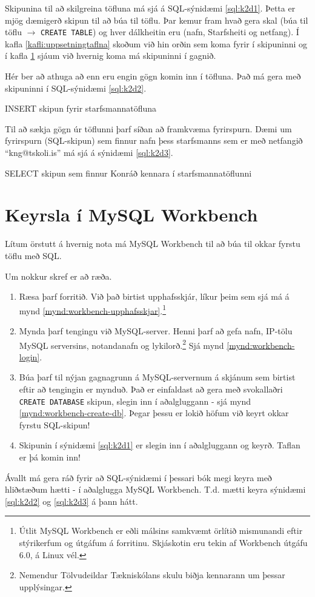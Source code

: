 Skipunina til að skilgreina töfluna má sjá á SQL-sýnidæmi \ref{sql:k2d1}. Þetta er mjög dæmigerð skipun til að búa til töflu. Þar kemur fram hvað gera skal (búa til töflu $\rightarrow$ \verb|CREATE TABLE|) og hver dálkheitin eru (nafn, Starfsheiti og netfang). Í kafla \ref{kafli:uppsetningtaflna} skoðum við hin orðin sem koma fyrir í skipuninni og í kafla \ref{undirkafli:keyrslaiworkbench} sjáum við hvernig koma má skipuninni í gagnið.

Hér ber að athuga að enn eru engin gögn komin inn í töfluna. Það má gera með skipuninni í SQL-sýnidæmi \ref{sql:k2d2}.

\begin{example}[h]
\caption{INSERT skipun fyrir starfsmannatöfluna}
\label{sql:k2d2}
\centering
{\small
{}
}
\end{example}

Til að sækja gögn úr töflunni þarf síðan að framkvæma fyrirspurn. Dæmi um fyrirspurn (SQL-skipun) sem finnur nafn þess starfsmanns sem er með netfangið ``kng@tskoli.is'' má sjá á sýnidæmi \ref{sql:k2d3}.

\begin{example}[h]
\caption{SELECT skipun sem finnur Konráð kennara í starfsmannatöflunni}
\label{sql:k2d3}
\centering
{}
\end{example}

\section{Keyrsla í MySQL Workbench}
\label{undirkafli:keyrslaiworkbench}
Lítum örstutt á hvernig nota má MySQL Workbench til að búa til okkar fyrstu töflu með SQL.

Um nokkur skref er að ræða.
\begin{enumerate}
 \item Ræsa þarf forritið. Við það birtist upphafsskjár, líkur þeim sem sjá má á mynd \ref{mynd:workbench-upphafsskjar}.\footnote{Útlit MySQL Workbench er eðli málsins samkvæmt örlítið mismunandi eftir stýrikerfum og útgáfum á forritinu. Skjáskotin eru tekin af Workbench útgáfu 6.0, á Linux vél.}
 \item Mynda þarf tengingu við MySQL-server. Henni þarf að gefa nafn, IP-tölu MySQL serversins, notandanafn og lykilorð.\footnote{Nemendur Tölvudeildar Tækniskólans skulu biðja kennarann um þessar upplýsingar.} Sjá mynd \ref{mynd:workbench-login}.
 \item Búa þarf til nýjan gagnagrunn á MySQL-servernum á skjánum sem birtist eftir að tengingin er mynduð. Það er einfaldast að gera með svokallaðri \verb|CREATE DATABASE| skipun, slegin inn í aðalgluggann - sjá mynd \ref{mynd:workbench-create-db}. Þegar þessu er lokið höfum við keyrt okkar fyrstu SQL-skipun!
 \item Skipunin í sýnidæmi \ref{sql:k2d1} er slegin inn í aðalgluggann og keyrð. Taflan er þá komin inn!
\end{enumerate}
Ávallt má gera ráð fyrir að SQL-sýnidæmi í þessari bók megi keyra með hliðstæðum hætti - í aðalglugga MySQL Workbench. T.d. mætti keyra sýnidæmi \ref{sql:k2d2} og \ref{sql:k2d3} á þann hátt.

